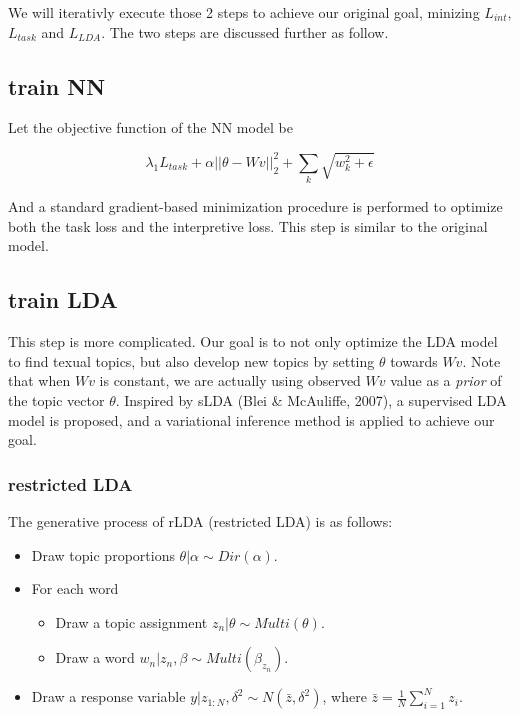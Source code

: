 \documentclass[12pt,a4paper]{ctexart}
\begin{document}
We will iterativly execute those 2 steps to achieve our original goal, minizing $L_{int}$, $L_{task}$ and $L_{LDA}$. The two steps are discussed further as follow.

\subsection{train NN}

Let the objective function of the NN model be

$$\lambda_1 L_{task} + \alpha ||\theta - Wv||_2^2 + \sum_k{\sqrt{w_k^2 + \epsilon}}$$

And a standard gradient-based minimization procedure is performed to optimize both the task loss and the interpretive loss. This step is similar to the original model.

\subsection{train LDA}

This step is more complicated. Our goal is to not only optimize the LDA model to find texual topics, but also develop new topics by setting $\theta$ towards $Wv$. Note that when $Wv$ is constant, we are actually using observed $Wv$ value as a \textit{prior} of the topic vector $\theta$. Inspired by sLDA (Blei \& McAuliffe, 2007), a supervised LDA model is proposed, and a variational inference method is applied to achieve our goal.

\subsubsection{restricted LDA}

The generative process of rLDA (restricted LDA) is as follows:

\begin{itemize}
	\item Draw topic proportions $\theta|\alpha \sim Dir(\alpha)$.
	
	\item For each word
	\begin{itemize}
		\item Draw a topic assignment $z_n|\theta \sim Multi(\theta)$.
		
		\item Draw a word $w_n | z_n, \beta \sim Multi(\beta_{z_n})$.
	\end{itemize}
	
	\item Draw a response variable $y|z_{1:N}, \delta^2 \sim N(\bar{z}, \delta^2)$, where $\bar{z}=\frac{1}{N}\sum_{i=1}^{N}z_i$.
\end{itemize}
\end{document}
